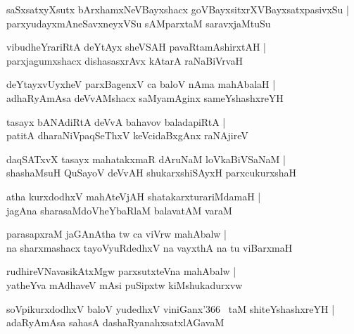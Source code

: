 \documentclass[twoside,12pt,openright]{book}
\newcounter{shloka}[chapter]
\begin{document}
\begin{shloka}%
saSxsatxyXsutx bArxhamxNeVBayxshacx goVBayxsitxrXVBayxsatxpasivxSu |\\
parxyudayxmAneSavxneyxVSu sAMparxtaM saravxjaMtuSu
\end{shloka}

\begin{shloka}%
vibudheYrariRtA deYtAyx sheVSAH pavaRtamAshirxtAH |\\
parxjagumxshacx dishasasxrAvx kAtarA raNaBiVrvaH 
\end{shloka}

\begin{shloka}%
deYtayxvUyxheV parxBagenxV ca baloV nAma mahAbalaH |\\
adhaRyAmAsa deVvAMshacx saMyamAginx sameYshashxreYH
\end{shloka}

\begin{shloka}%
tasayx bANAdiRtA deVvA bahavov baladapiRtA |\\
patitA dharaNiVpaqSeThxV keVcidaBxgAnx raNAjireV 
\end{shloka}

\begin{shloka}%
daqSATxvX tasayx mahatakxmaR dAruNaM loVkaBiVSaNaM |\\
shashaMsuH QuSayoV deVvAH shukarxshiSAyxH parxcukurxshaH 
\end{shloka}

\begin{shloka}%
atha kurxdodhxV mahAteVjAH shatakarxturariMdamaH |\\
jagAna sharasaMdoVheYbaRlaM balavatAM varaM 
\end{shloka}

\begin{shloka}%
parasapxraM jaGAnAtha tw ca viVrw mahAbalw |\\
na sharxmashacx tayoVyuRdedhxV na vayxthA na tu viBarxmaH
\end{shloka}

\begin{shloka}%
rudhireVNavasikAtxMgw parxsutxteVna mahAbalw |\\
yatheYva mAdhaveV mAsi puSipxtw kiMshukadurxvw 
\end{shloka}

\begin{shloka}%
soVpikurxdodhxV baloV yudedhxV viniGanx\char'366 ~taM shiteYshashxreYH |\\
adaRyAmAsa sahasA dashaRyanahxsatxlAGavaM
\end{shloka}
\end{document}
